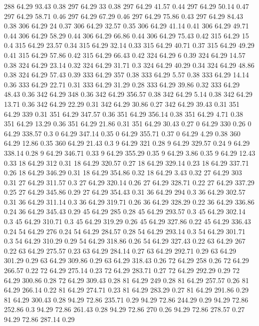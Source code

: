 288	64.29	93.43	0.38
297	64.29	33	0.38
297	64.29	41.57	0.44
297	64.29	50.14	0.47
297	64.29	58.71	0.46
297	64.29	67.29	0.46
297	64.29	75.86	0.43
297	64.29	84.43	0.38
306	64.29	24	0.37
306	64.29	32.57	0.35
306	64.29	41.14	0.41
306	64.29	49.71	0.44
306	64.29	58.29	0.44
306	64.29	66.86	0.44
306	64.29	75.43	0.42
315	64.29	15	0.4
315	64.29	23.57	0.34
315	64.29	32.14	0.33
315	64.29	40.71	0.37
315	64.29	49.29	0.41
315	64.29	57.86	0.42
315	64.29	66.43	0.42
324	64.29	6	0.39
324	64.29	14.57	0.38
324	64.29	23.14	0.32
324	64.29	31.71	0.3
324	64.29	40.29	0.34
324	64.29	48.86	0.38
324	64.29	57.43	0.39
333	64.29	357	0.38
333	64.29	5.57	0.38
333	64.29	14.14	0.36
333	64.29	22.71	0.31
333	64.29	31.29	0.28
333	64.29	39.86	0.32
333	64.29	48.43	0.36
342	64.29	348	0.36
342	64.29	356.57	0.38
342	64.29	5.14	0.38
342	64.29	13.71	0.36
342	64.29	22.29	0.31
342	64.29	30.86	0.27
342	64.29	39.43	0.31
351	64.29	339	0.31
351	64.29	347.57	0.36
351	64.29	356.14	0.38
351	64.29	4.71	0.38
351	64.29	13.29	0.36
351	64.29	21.86	0.31
351	64.29	30.43	0.27
0	64.29	330	0.26
0	64.29	338.57	0.3
0	64.29	347.14	0.35
0	64.29	355.71	0.37
0	64.29	4.29	0.38
360	64.29	12.86	0.35
360	64.29	21.43	0.3
9	64.29	321	0.28
9	64.29	329.57	0.24
9	64.29	338.14	0.28
9	64.29	346.71	0.33
9	64.29	355.29	0.35
9	64.29	3.86	0.35
9	64.29	12.43	0.33
18	64.29	312	0.31
18	64.29	320.57	0.27
18	64.29	329.14	0.23
18	64.29	337.71	0.26
18	64.29	346.29	0.31
18	64.29	354.86	0.32
18	64.29	3.43	0.32
27	64.29	303	0.31
27	64.29	311.57	0.3
27	64.29	320.14	0.26
27	64.29	328.71	0.22
27	64.29	337.29	0.25
27	64.29	345.86	0.29
27	64.29	354.43	0.31
36	64.29	294	0.3
36	64.29	302.57	0.31
36	64.29	311.14	0.3
36	64.29	319.71	0.26
36	64.29	328.29	0.22
36	64.29	336.86	0.24
36	64.29	345.43	0.29
45	64.29	285	0.28
45	64.29	293.57	0.3
45	64.29	302.14	0.3
45	64.29	310.71	0.3
45	64.29	319.29	0.26
45	64.29	327.86	0.22
45	64.29	336.43	0.24
54	64.29	276	0.24
54	64.29	284.57	0.28
54	64.29	293.14	0.3
54	64.29	301.71	0.3
54	64.29	310.29	0.29
54	64.29	318.86	0.26
54	64.29	327.43	0.22
63	64.29	267	0.22
63	64.29	275.57	0.23
63	64.29	284.14	0.27
63	64.29	292.71	0.29
63	64.29	301.29	0.29
63	64.29	309.86	0.29
63	64.29	318.43	0.26
72	64.29	258	0.26
72	64.29	266.57	0.22
72	64.29	275.14	0.23
72	64.29	283.71	0.27
72	64.29	292.29	0.29
72	64.29	300.86	0.28
72	64.29	309.43	0.28
81	64.29	249	0.28
81	64.29	257.57	0.26
81	64.29	266.14	0.22
81	64.29	274.71	0.23
81	64.29	283.29	0.27
81	64.29	291.86	0.29
81	64.29	300.43	0.28
94.29	72.86	235.71	0.29
94.29	72.86	244.29	0.29
94.29	72.86	252.86	0.3
94.29	72.86	261.43	0.28
94.29	72.86	270	0.26
94.29	72.86	278.57	0.27
94.29	72.86	287.14	0.29
